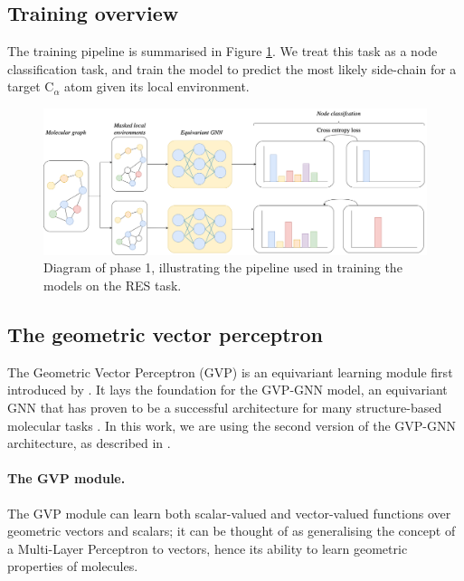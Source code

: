 \subsection{Training overview}
The training pipeline is summarised in Figure \ref{res-task}. We treat this task as a node classification task, and train the model to predict the most likely side-chain for a target $\text{C}_{\alpha}$ atom given its local environment.

\begin{figure}[!h]
    \centering
    \includegraphics[width=\textwidth]{masters-report/figures/res_task_correct.png}
    \caption{Diagram of phase 1, illustrating the pipeline used in training the models on the RES task.}
    \label{res-task}
\end{figure}

\subsection{The geometric vector perceptron}
The Geometric Vector Perceptron (GVP) is an equivariant learning module first introduced by \citet{gvp1}. It lays the foundation for the GVP-GNN model, an equivariant GNN that has proven to be a successful architecture for many structure-based molecular tasks \cite{gvp1, gvp2}. In this work, we are using the second version of the GVP-GNN architecture, as described in \citet{gvp2}. 

\paragraph{The GVP module.}
The GVP module can learn both scalar-valued and vector-valued functions over geometric vectors and scalars; it can be thought of as generalising the concept of a Multi-Layer Perceptron to vectors, hence its ability to learn geometric properties of molecules. 

